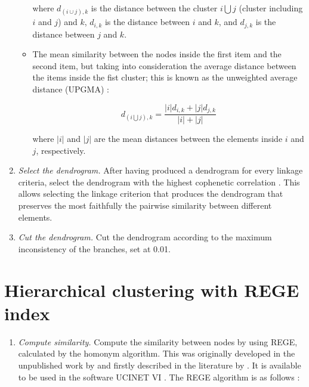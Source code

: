 \documentclass[twocolumn]{article}
\begin{document}
\begin{appendices}
\begin{enumerate}
\begin{itemize}
											\noindent where $d_{\left(i\cup j\right),k}$ is the distance between the cluster $i \bigcup j$ (cluster including $i$ and $j$) and $k$, $d_{i,k}$ is the distance between $i$ and $k$, and  $d_{j,k}$ is the distance between $j$ and $k$.
				      \item	The mean similarity between the nodes inside the first item and the second item, but taking into consideration the average distance between the items inside the fist cluster; this is known as the unweighted average distance (UPGMA) \citep{Sokal1958}:

				            	\begin{equation}
					            	d_{(i \bigcup j),k}=\frac{|i|d_{i,k}+|j|d_{j,k}}{|i|+|j|} \label{eqn:UPGMA}
				            	\end{equation}

							\noindent where $|i|$ and $|j|$ are the mean distances between the elements inside $i$ and $j$, respectively.
			      \end{itemize}

			\item \emph{Select the dendrogram.} \smallskip \newline
						After having produced a dendrogram for every linkage criteria, select the dendrogram with the highest cophenetic correlation \citep{Sokal1962}.
			      This allows selecting the linkage criterion that produces the dendrogram that preserves the most faithfully the pairwise similarity between different elements.

			\item \emph{Cut the dendrogram.} \smallskip \newline
			      Cut the dendrogram according to the maximum inconsistency of the branches, set at 0.01.

		\end{enumerate}

	\section{Hierarchical clustering with REGE index} \label{appendix:rege}

		\begin{enumerate}

			\item \emph{Compute similarity.} \smallskip \newline
			Compute the similarity between nodes by using REGE, calculated by the homonym algorithm. This was originally developed in the unpublished work by \citet{White1980,White1982,White1984} and firstly described in the literature by \citet{Borgatti1993}. It is available to be used in the software UCINET VI \citet{Borgatti2002}. The REGE algorithm is as follows \citep{Jordan2018}:


\end{enumerate}
\end{appendices}
\end{document}
